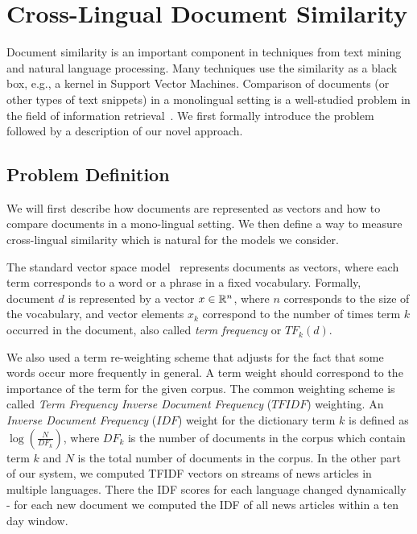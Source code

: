 %
\chapter{Cross-Lingual Document Similarity}\label{chap:crosslingual}

Document similarity is an important component in techniques from text mining and natural language processing.
Many techniques use the similarity as a black box, e.g., a kernel in Support Vector Machines.
Comparison of documents (or other types of text snippets) in a monolingual setting is a
well-studied problem in the field of information retrieval~\cite{Salton88term-weightingapproaches}.
We first formally introduce the problem followed by a description of our novel approach.

\section{Problem Definition}\label{chap:crosslingual:problem}
We will first describe how documents are represented as vectors and how to compare documents in
a mono-lingual setting. We then define a way to measure cross-lingual similarity which is natural
for the models we consider.

The standard vector space model~\cite{Salton88term-weightingapproaches} represents documents as
vectors, where each term corresponds to a word or a phrase in a fixed vocabulary. Formally,
document $d$ is represented by a vector $x \in \mathbb{R}^n$, where $n$ corresponds to the size
of the vocabulary, and vector elements $x_k$ correspond to the number of times term $k$
occurred in the document, also called \emph{term frequency} or $TF_k(d)$.

We also used a term re-weighting scheme that adjusts for the fact that some words occur more frequently in general. A term weight should correspond to the importance of the term for the given corpus. The common weighting scheme is called \emph{Term Frequency Inverse Document Frequency} ($TFIDF$) weighting. An \emph{Inverse Document Frequency} ($IDF$) weight for the dictionary term $k$ is defined as $\log\left( \frac{N}{DF_k} \right)$, where $DF_k$ is the number of documents in the corpus which contain term $k$ and $N$ is the total number of documents in the corpus. In the other part of our system, we computed TFIDF vectors on streams
of news articles in multiple languages. There the IDF scores for each language changed
dynamically - for each new document we computed the IDF of all news articles within
a ten day window. 

